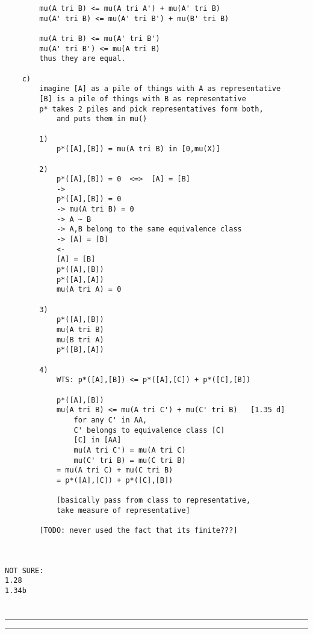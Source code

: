 \documentclass{article}
\begin{document}
\begin{flushleft}
\begin{verbatim}
        mu(A tri B) <= mu(A tri A') + mu(A' tri B)
        mu(A' tri B) <= mu(A' tri B') + mu(B' tri B)

        mu(A tri B) <= mu(A' tri B')
        mu(A' tri B') <= mu(A tri B)
        thus they are equal.

    c)
        imagine [A] as a pile of things with A as representative 
        [B] is a pile of things with B as representative 
        p* takes 2 piles and pick representatives form both, 
            and puts them in mu()

        1)
            p*([A],[B]) = mu(A tri B) in [0,mu(X)]

        2)
            p*([A],[B]) = 0  <=>  [A] = [B]
            ->
            p*([A],[B]) = 0
            -> mu(A tri B) = 0
            -> A ~ B
            -> A,B belong to the same equivalence class
            -> [A] = [B]
            <-
            [A] = [B]
            p*([A],[B])
            p*([A],[A])
            mu(A tri A) = 0

        3)
            p*([A],[B])
            mu(A tri B)
            mu(B tri A)
            p*([B],[A])
        
        4)
            WTS: p*([A],[B]) <= p*([A],[C]) + p*([C],[B])
            
            p*([A],[B])
            mu(A tri B) <= mu(A tri C') + mu(C' tri B)   [1.35 d]
                for any C' in AA, 
                C' belongs to equivalence class [C]
                [C] in [AA]
                mu(A tri C') = mu(A tri C)
                mu(C' tri B) = mu(C tri B)
            = mu(A tri C) + mu(C tri B)
            = p*([A],[C]) + p*([C],[B])

            [basically pass from class to representative, 
            take measure of representative]

        [TODO: never used the fact that its finite???]



NOT SURE: 
1.28    
1.34b

\end{verbatim}


\section*{}
\bigbreak
\hrule
\bigbreak

\bigbreak
\hrule
\bigbreak
\textbf{}



\end{flushleft}
\end{document}
